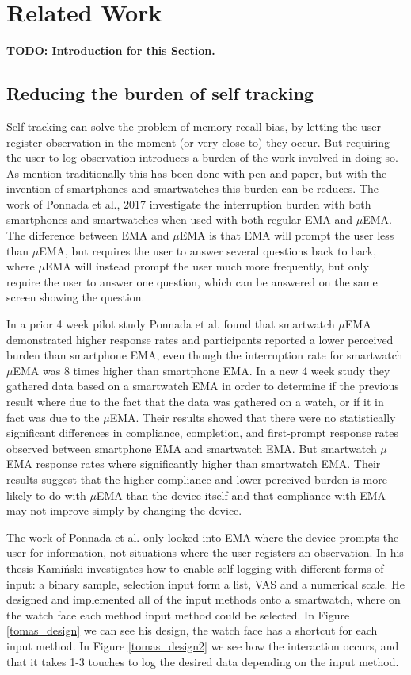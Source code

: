 \chapter{Related Work}

\textbf{TODO: Introduction for this Section.}

\section{Reducing the burden of self tracking}
Self tracking can solve the problem of memory recall bias, by letting the user register observation in the moment (or very close to) they occur. But requiring the user to log observation introduces a burden of the work involved in doing so. As mention traditionally this has been done with pen and paper, but with the invention of smartphones and smartwatches this burden can be reduces. The work of Ponnada et al., 2017\cite{compare} investigate the interruption burden with both smartphones and smartwatches when used with both regular EMA and $\mu$EMA. The difference between EMA and $\mu$EMA is that EMA will prompt the user less than $\mu$EMA, but requires the user to answer several questions back to back, where $\mu$EMA will instead prompt the user much more frequently, but only require the user to answer one question, which can be answered on the same screen showing the question. 

In a prior 4 week pilot study Ponnada et al.\cite{compare} found that smartwatch $\mu$EMA demonstrated higher response rates and participants reported a lower perceived burden than smartphone EMA, even though the interruption rate for smartwatch $\mu$EMA was 8 times higher than smartphone EMA. In a new 4 week study they gathered data based on a smartwatch EMA in order to determine if the previous result where due to the fact that the data was gathered on a watch, or if it in fact was due to the $\mu$EMA. Their results showed that there were no statistically significant differences in compliance, completion, and first-prompt response rates observed between smartphone EMA and smartwatch EMA. But smartwatch $\mu$EMA response rates where significantly higher than smartwatch EMA. Their results suggest that the higher compliance and lower perceived burden is more likely to do with $\mu$EMA than the device itself and that compliance with EMA may not improve simply by changing the device.

The work of Ponnada et al. only looked into EMA where the device prompts the user for information, not situations where the user registers an observation. In his thesis Kami\'nski\cite{tomas} investigates how to enable self logging with different forms of input: a binary sample, selection input form a list, VAS and a numerical scale. He designed and implemented all of the input methods onto a smartwatch, where on the watch face each method input method could be selected. In Figure \ref{tomas_design} we can see his design, the watch face has a shortcut for each input method. In Figure \ref{tomas_design2} we see how the interaction occurs, and that it takes 1-3 touches to log the desired data depending on the input method.

